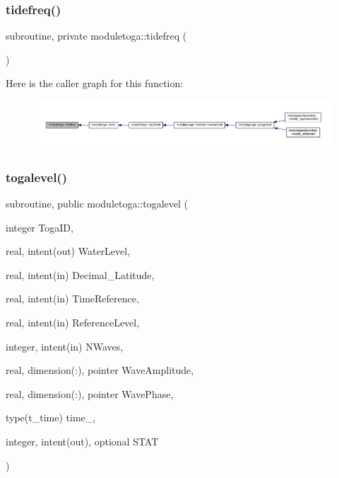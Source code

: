 \subsubsection{\texorpdfstring{tidefreq()}{tidefreq()}}
{\footnotesize\ttfamily subroutine, private moduletoga\+::tidefreq (\begin{DoxyParamCaption}{ }\end{DoxyParamCaption})\hspace{0.3cm}{\ttfamily [private]}}

Here is the caller graph for this function\+:\nopagebreak
\begin{figure}[H]
\begin{center}
\leavevmode
\includegraphics[width=350pt]{namespacemoduletoga_a910478c59872b8cd57611ae642b29980_icgraph}
\end{center}
\end{figure}
\mbox{\label{namespacemoduletoga_a42e9e4f606a8d51d59a07cbe2c0a1299}} 
\subsubsection{\texorpdfstring{togalevel()}{togalevel()}}
{\footnotesize\ttfamily subroutine, public moduletoga\+::togalevel (\begin{DoxyParamCaption}\item[{integer}]{Toga\+ID,  }\item[{real, intent(out)}]{Water\+Level,  }\item[{real, intent(in)}]{Decimal\+\_\+\+Latitude,  }\item[{real, intent(in)}]{Time\+Reference,  }\item[{real, intent(in)}]{Reference\+Level,  }\item[{integer, intent(in)}]{N\+Waves,  }\item[{real, dimension(\+:), pointer}]{Wave\+Amplitude,  }\item[{real, dimension(\+:), pointer}]{Wave\+Phase,  }\item[{type(t\+\_\+time)}]{time\+\_\+,  }\item[{integer, intent(out), optional}]{S\+T\+AT }\end{DoxyParamCaption})}

